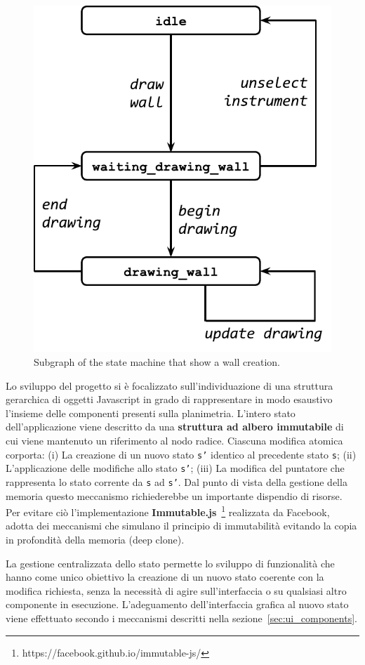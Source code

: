 \begin{figure}[!t]
\centering
\includegraphics[width=0.6\linewidth]{contents/images/uc_draw_wall}

\caption{Subgraph of the state machine that show a wall creation.}
\label{fig_uc_draw_wall}
\end{figure}

\iffalse
Lo sviluppo del progetto si \`e focalizzato sull'individuazione di una struttura gerarchica di oggetti Javascript in grado di rappresentare in modo esaustivo l'insieme delle componenti presenti sulla planimetria. L'intero stato dell'applicazione viene descritto da una \textbf{struttura ad albero immutabile} di cui viene mantenuto un riferimento al nodo radice. Ciascuna modifica atomica corporta: (i) La creazione di un nuovo stato \texttt{s'} identico al precedente stato \texttt{s}; (ii) L'applicazione delle modifiche allo stato \texttt{s'}; (iii) La modifica del puntatore che rappresenta lo stato corrente da \texttt{s} ad \texttt{s'}. Dal punto di vista della gestione della memoria questo meccanismo richiederebbe un importante dispendio di risorse. Per evitare ci\`o l'implementazione \textbf{Immutable.js}~\footnote{https://facebook.github.io/immutable-js/} realizzata da Facebook, adotta dei meccanismi che simulano il principio di immutabilit\`a evitando la copia in profondit\`a della memoria  (deep clone).

La gestione centralizzata dello stato permette lo sviluppo di funzionalità che hanno come unico obiettivo la creazione di un nuovo stato coerente con la modifica richiesta, senza la necessità di agire sull'interfaccia o su qualsiasi altro componente in esecuzione. L'adeguamento dell'interfaccia grafica al nuovo stato viene effettuato secondo i meccanismi descritti nella sezione~\ref{sec:ui_components}.

